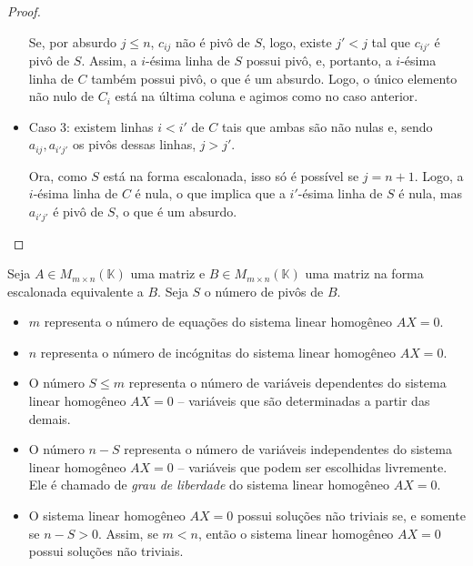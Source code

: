 \begin{proof}
\begin{itemize}
    Se, por absurdo $j\leq n$, $c_{ij}$ não é pivô de $S$, logo, existe $j'<j$ tal que $c_{ij'}$ é pivô de $S$.
    Assim, a $i$-ésima linha de $S$ possui pivô, e, portanto, a $i$-ésima linha de $C$ também possui pivô, o que é um absurdo.
    Logo, o único elemento não nulo de $C_i$ está na última coluna e agimos como no caso anterior.
    \item Caso 3: existem linhas $i<i'$ de $C$ tais que ambas são não nulas e, sendo $a_{ij}, a_{i'j'}$ os pivôs dessas linhas, $j>j'$.
    
    Ora, como $S$ está na forma escalonada, isso só é possível se $j=n+1$.
    Logo, a $i$-ésima linha de $C$ é nula, o que implica que a $i'$-ésima linha de $S$ é nula, mas $a_{i'j'}$ é pivô de $S$, o que é um absurdo.
\end{itemize}
\end{proof}
\begin{proposition}
    Seja $A \in M_{m \times n}(\mathbb K)$ uma matriz e $B \in M_{m \times n}(\mathbb K)$ uma matriz na forma escalonada equivalente a $B$.
    Seja $S$ o número de pivôs de $B$.

    \begin{itemize}
        \item $m$ representa o número de equações do sistema linear homogêneo $AX=0$.
        \item $n$ representa o número de incógnitas do sistema linear homogêneo $AX=0$.
        \item O número $S\leq m$ representa o número de variáveis dependentes do sistema linear homogêneo $AX=0$ -- variáveis que são determinadas a partir das demais.
        \item O número $n-S$ representa o número de variáveis independentes do sistema linear homogêneo $AX=0$ -- variáveis que podem ser escolhidas livremente. Ele é chamado de \emph{grau de liberdade} do sistema linear homogêneo $AX=0$.
        \item O sistema linear homogêneo $AX=0$ possui soluções não triviais se, e somente se $n-S>0$. Assim, se $m<n$, então o sistema linear homogêneo $AX=0$ possui soluções não triviais.
    \end{itemize}
\end{proposition}